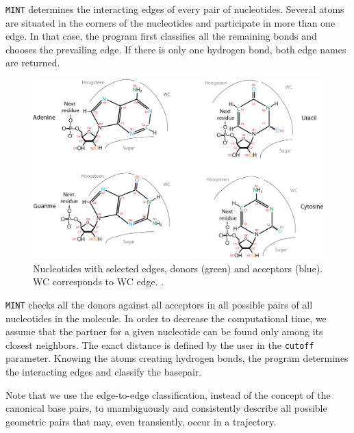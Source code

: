 \documentclass[12pt]{article}
\begin{document}
{\tt MINT} determines the interacting edges of every pair of nucleotides. Several atoms are situated in the corners of the nucleotides and participate in more than one edge. In that case, the program first classifies all the remaining bonds and chooses the prevailing edge. If there is only one hydrogen bond, both edge names are returned. 

\begin{figure}[h!]
\centering
\includegraphics[width = 14cm]{./pictures/donors_acceptors_nucleotides.png}
\caption{Nucleotides with selected edges, donors (green) and acceptors (blue). WC corresponds to WC edge.  \cite{Lescoute2006}.}
\label{Edges}
\end{figure}

{\tt MINT} checks all the donors against all acceptors in all possible pairs of all nucleotides in the molecule. In order to decrease the computational time, we assume that the partner for a given nucleotide can be found only among its closest neighbors. The exact distance is defined by the user in the {\tt cutoff} parameter. Knowing the atoms creating hydrogen bonds, the program  determines the interacting edges and classify the basepair.

Note that we use the edge-to-edge classification, instead of the concept of the canonical base pairs, to unambiguously and consistently describe all possible geometric pairs that may, even transiently, occur in a trajectory.
\end{document}

